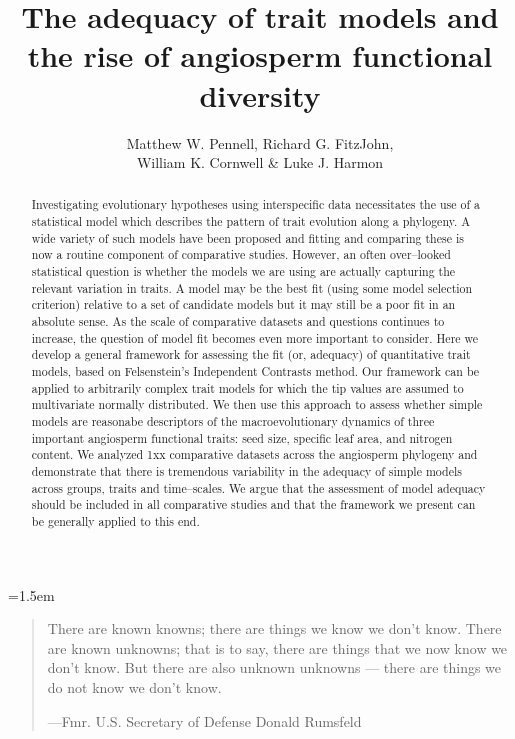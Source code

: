 \documentclass[12pt]{article}
\title{The adequacy of trait models and the rise of angiosperm functional diversity}
\author{
Matthew W. Pennell, Richard G. FitzJohn,\\
William K. Cornwell \& Luke J. Harmon
}
\date{}
\begin{document}
\maketitle
\parindent=1.5em
\addtolength{\parskip}{.3em}
\vfill


\begin{abstract}
Investigating evolutionary hypotheses using interspecific data necessitates the use of a statistical model which describes the pattern of trait evolution along a phylogeny. A wide variety of such models have been proposed and fitting and comparing these is now a routine component of comparative studies. However, an often over--looked statistical question is whether the models we are using are actually capturing the relevant variation in traits. A model may be the best fit (using some model selection criterion) relative to a set of candidate models but it may still be a poor fit in an absolute sense. As the scale of comparative datasets and questions continues to increase, the question of model fit becomes even more important to consider. Here we develop a general framework for assessing the fit (or, adequacy) of quantitative trait models, based on Felsenstein's Independent Contrasts method. Our framework can be applied to arbitrarily complex trait models for which the tip values are assumed to multivariate normally distributed. We then use this approach to assess whether simple models are reasonabe descriptors of the macroevolutionary dynamics of three important angiosperm functional traits: seed size, specific leaf area, and nitrogen content. We analyzed 1xx comparative datasets across the angiosperm phylogeny and demonstrate that there is tremendous variability in the adequacy of simple models across groups, traits and time--scales. We argue that the assessment of model adequacy should be included in all comparative studies and that the framework we present can be generally applied to this end.
\end{abstract}

\vfill

\newpage


\begin{quotation}
\noindent There are known knowns; there are things we know we don't know. There are known unknowns; that is to say, there are things that we now know we don't know. But there are also unknown unknowns --- there are things we do not know we don't know.

---Fmr. U.S. Secretary of Defense Donald Rumsfeld
\end{quotation}
\end{document}
